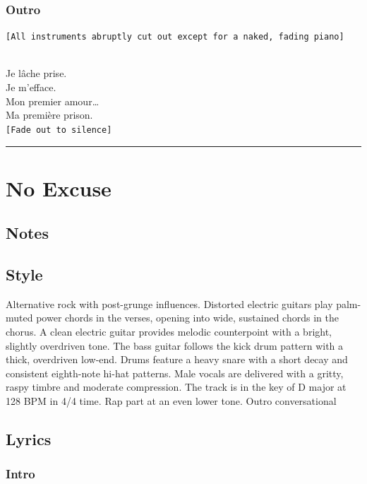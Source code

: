 \subsubsection{Outro}\label{outro-4}

\texttt{{[}All\ instruments\ abruptly\ cut\ out\ except\ for\ a\ naked,\ fading\ piano{]}}\strut \\
Je lâche prise.\\
Je m'efface.\\
Mon premier amour\ldots{}\\
Ma première prison.\\
\texttt{{[}Fade\ out\ to\ silence{]}}

\begin{center}\rule{0.5\linewidth}{0.5pt}\end{center}

\section{No Excuse}\label{no-excuse}

\subsection{Notes}\label{notes-19}

\subsection{Style}\label{style-18}

Alternative rock with post-grunge influences. Distorted electric guitars
play palm-muted power chords in the verses, opening into wide, sustained
chords in the chorus. A clean electric guitar provides melodic
counterpoint with a bright, slightly overdriven tone. The bass guitar
follows the kick drum pattern with a thick, overdriven low-end. Drums
feature a heavy snare with a short decay and consistent eighth-note
hi-hat patterns. Male vocals are delivered with a gritty, raspy timbre
and moderate compression. The track is in the key of D major at 128 BPM
in 4/4 time. Rap part at an even lower tone. Outro conversational

\subsection{Lyrics}\label{lyrics-18}

\subsubsection{Intro}\label{intro-1}

